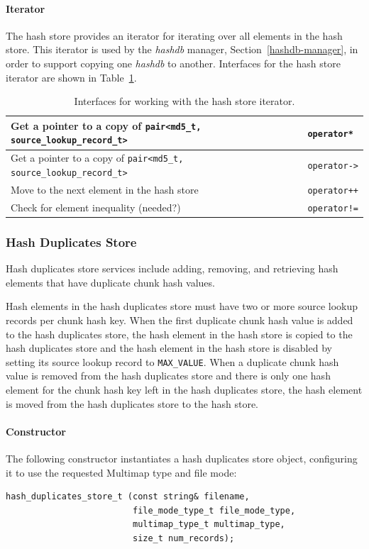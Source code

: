 \documentclass[12pt,twoside]{article}
\newcommand{\hdb}{\emph{hashdb}\xspace}
\begin{document}
\paragraph{Iterator}
The hash store provides an iterator for iterating over all elements in the hash store.
This iterator is used by the \hdb manager, Section~\ref{hashdb-manager},
in order to support copying one \hdb to another.
Interfaces for the hash store iterator are shown in Table~\ref{hash-store-iterator-interfaces}.
\begin{table}[h]
\center
\begin{tabular}{|p{2in}|p{4in}|}
\hline
Get a pointer to a copy of \texttt{pair<md5\_t, source\_lookup\_record\_t>} & \texttt{operator*} \\
\hline
Get a pointer to a copy of \texttt{pair<md5\_t, source\_lookup\_record\_t>} & \texttt{operator->} \\
\hline
Move to the next element in the hash store & \texttt{operator++} \\
\hline
Check for element inequality (needed?) & \texttt{operator!=} \\
\hline
\end{tabular}
\caption{Interfaces for working with the hash store iterator.\label{hash-store-iterator-interfaces}}
\end{table}

\subsubsection{Hash Duplicates Store}
Hash duplicates store services include adding, removing,
and retrieving hash elements that have duplicate chunk hash values.

Hash elements in the hash duplicates store must have two or more source lookup records
per chunk hash key.
When the first duplicate chunk hash value is added to the hash duplicates store,
the hash element in the hash store is copied to the hash duplicates store
and the hash element in the hash store is disabled by setting
its source lookup record to \texttt{MAX\_VALUE}.
When a duplicate chunk hash value is removed from the hash duplicates store
and there is only one hash element for the chunk hash key left in the hash duplicates store,
the hash element is moved from the hash duplicates store to the hash store.

\paragraph{Constructor}
The following constructor instantiates a hash duplicates store object,
configuring it to use the requested Multimap type and file mode:
\begin{small}
\begin{verbatim}
hash_duplicates_store_t (const string& filename,
                         file_mode_type_t file_mode_type,
                         multimap_type_t multimap_type,
                         size_t num_records);
\end{verbatim}
\end{small}
\end{document}
